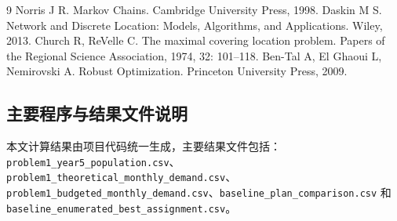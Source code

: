 \begin{thebibliography}{9}
 Norris J R. Markov Chains. Cambridge University Press, 1998.
 Daskin M S. Network and Discrete Location: Models, Algorithms, and Applications. Wiley, 2013.
 Church R, ReVelle C. The maximal covering location problem. Papers of the Regional Science Association, 1974, 32: 101--118.
 Ben-Tal A, El Ghaoui L, Nemirovski A. Robust Optimization. Princeton University Press, 2009.
\end{thebibliography}

\begin{appendices}
\section{主要程序与结果文件说明}
本文计算结果由项目代码统一生成，主要结果文件包括：\texttt{problem1\_year5\_population.csv}、\texttt{problem1\_theoretical\_monthly\_demand.csv}、\texttt{problem1\_budgeted\_monthly\_demand.csv}、\texttt{baseline\_plan\_comparison.csv} 和 \texttt{baseline\_enumerated\_best\_assignment.csv}。
\end{appendices}
